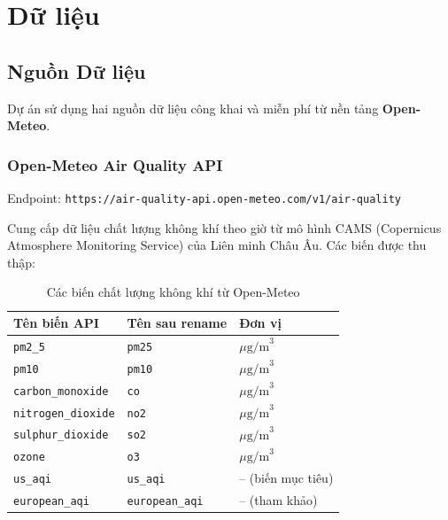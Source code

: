 \documentclass[12pt,a4paper]{report}
\begin{document}
\chapter{Dữ liệu}

\section{Nguồn Dữ liệu}

Dự án sử dụng hai nguồn dữ liệu công khai và miễn phí từ nền tảng \textbf{Open-Meteo}.

\subsection{Open-Meteo Air Quality API}

Endpoint: \texttt{https://air-quality-api.open-meteo.com/v1/air-quality}

Cung cấp dữ liệu chất lượng không khí theo giờ từ mô hình CAMS (Copernicus Atmosphere Monitoring Service) của Liên minh Châu Âu. Các biến được thu thập:

\begin{table}[H]
\centering
\caption{Các biến chất lượng không khí từ Open-Meteo}
\label{tab:air_vars}
\begin{tabular}{lll}
\toprule
\textbf{Tên biến API} & \textbf{Tên sau rename} & \textbf{Đơn vị} \\
\midrule
\texttt{pm2\_5}           & \texttt{pm25}    & $\mu\text{g/m}^3$ \\
\texttt{pm10}             & \texttt{pm10}    & $\mu\text{g/m}^3$ \\
\texttt{carbon\_monoxide} & \texttt{co}      & $\mu\text{g/m}^3$ \\
\texttt{nitrogen\_dioxide}& \texttt{no2}     & $\mu\text{g/m}^3$ \\
\texttt{sulphur\_dioxide} & \texttt{so2}     & $\mu\text{g/m}^3$ \\
\texttt{ozone}            & \texttt{o3}      & $\mu\text{g/m}^3$ \\
\texttt{us\_aqi}          & \texttt{us\_aqi} & -- (biến mục tiêu) \\
\texttt{european\_aqi}    & \texttt{european\_aqi} & -- (tham khảo) \\
\bottomrule
\end{tabular}
\end{table}
\end{document}
